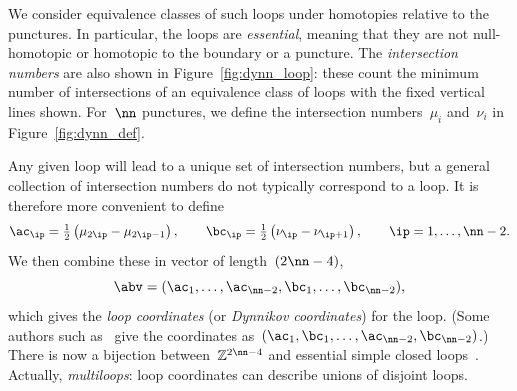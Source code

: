 \documentclass[12pt]{article}
\renewcommand{\l}{\left}			%
\renewcommand{\r}{\right}			%
\begin{document}
%
We consider equivalence classes of such loops under homotopies
relative to the punctures.  In particular, the loops are
\emph{essential}, meaning that they are not null-homotopic or
homotopic to the boundary or a puncture.  The \emph{intersection
  numbers} are also shown in Figure~\ref{fig:dynn_loop}: these count
the minimum number of intersections of an equivalence class of loops
with the fixed vertical lines shown.  For~$\nn$ punctures, we define
the intersection numbers~$\mu_i$ and~$\nu_i$ in
Figure~\ref{fig:dynn_def}.

Any given loop will lead to a unique set of intersection numbers, but
a general collection of intersection numbers do not typically
correspond to a loop.  It is therefore more convenient to define
\begin{equation}
  \ac_\ip = \tfrac12\l(\mu_{2\ip} - \mu_{2\ip-1}\r), \qquad
  \bc_\ip = \tfrac12\l(\nu_\ip - \nu_{\ip+1}\r), \qquad
  \ip=1,\ldots,\nn-2.
\end{equation}
We then combine these in vector of length~$(2\nn-4)$,
\begin{equation}
  \abv = (\ac_1,\ldots,\ac_{\nn-2},\bc_1,\ldots,\bc_{\nn-2}),
  \label{eq:abvdef}
\end{equation}
which gives the \emph{loop coordinates} (or \emph{Dynnikov
  coordinates}) for the loop.  (Some authors such
as~\citet{Dehornoy2008} give the coordinates
as~$(\ac_1,\bc_1,\ldots,\ac_{\nn-2},\bc_{\nn-2})$.)  There is now a
bijection between~$\mathbb{Z}^{2\nn-4}$ and essential simple closed
loops~\citep{Dynnikov2002,Moussafir2006,Hall2009,Thiffeault2010}.
Actually, \emph{multiloops}: loop coordinates can describe unions of
disjoint loops.
\end{document}
